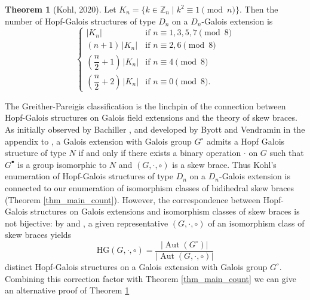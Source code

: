 \documentclass[reqno]{amsart}
\theoremstyle{definition}
\newtheorem{theorem}{Theorem}[section]
\newcommand{\Z}{\mathbb{Z}}
\DeclareMathOperator{\Aut}{\mbox{Aut}}
\begin{document}
\begin{theorem}[Kohl, 2020] \label{thm_Kohl}
Let $ K_{n} = \{ k \in \Z_{n} \mid k^{2} \equiv 1 \pmod{n} \} $. Then the number of Hopf-Galois structures of type $ D_{n} $ on a $ D_{n} $-Galois extension is
\[
\begin{cases}
|K_{n}| & \text{if } n \equiv 1,3,5,7 \pmod{8} \\[6pt]
(n + 1)\,|K_{n}| & \text{if } n \equiv 2,6 \pmod{8} \\[6pt]
\left(\dfrac{n}{2} + 1\right)\,|K_{n}| & \text{if } n \equiv 4 \pmod{8} \\[6pt]
\left(\dfrac{n}{2} + 2\right)\,|K_{n}| & \text{if } n \equiv 0 \pmod{8}.
\end{cases}
\]
\end{theorem}

The Greither-Pareigis classification is the linchpin of the connection between Hopf-Galois structures on Galois field extensions and the theory of skew braces. As initially observed by Bachiller \cite{Ba16}, and developed by Byott and Vendramin in the appendix to \cite{SV18}, a Galois extension with Galois group $ G^{\circ} $ admits a Hopf Galois structure of type $ N $ if and only if there exists a binary operation $ \cdot $ on $ G $ such that $ G^{\bullet} $ is a group isomorphic to $ N $ and $ (G,\cdot,\circ) $ is a skew brace. Thus Kohl's enumeration of Hopf-Galois structures of type $ D_{n} $ on a $ D_{n} $-Galois extension is connected to our enumeration of isomorphism classes of bidihedral skew braces (Theorem \ref{thm_main_count}). However, the correspondence between Hopf-Galois structures on Galois extensions and isomorphism classes of skew braces is not bijective: by \cite[Corollary 3.2]{KT23} and \cite[Corollary 2.4]{NZ19}, a given representative $ (G,\cdot,\circ) $ of an isomorphism class of skew braces yields 
\begin{equation} \label{eqn_HGS_correction_factor}
\mathrm{HG}(G,\cdot,\circ) = \frac{| \Aut(G^{\circ}) |}{ | \Aut(G,\cdot,\circ) | } 
\end{equation}
distinct Hopf-Galois structures on a Galois extension with Galois group $ G^{\circ} $. Combining this correction factor with Theorem \ref{thm_main_count} we can give an alternative proof of Theorem \ref{thm_Kohl}
\end{document}
